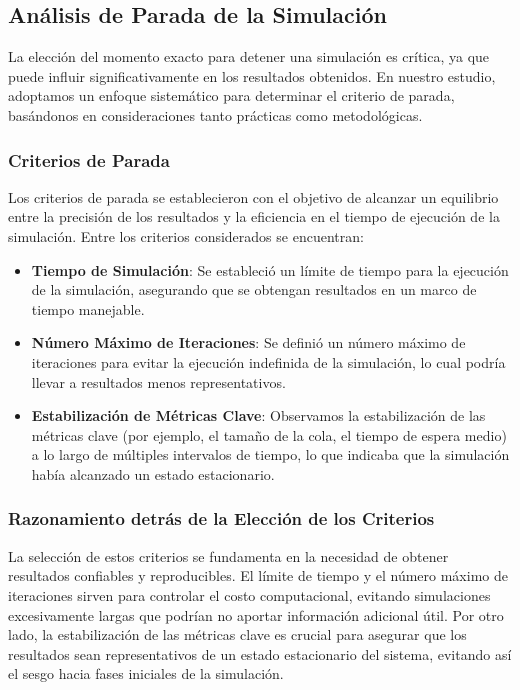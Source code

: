 \documentclass[10pt,twocolumn]{article}
\begin{document}
{\subsection{Análisis de Parada de la Simulación}
La elección del momento exacto para detener una simulación es crítica, ya que puede influir significativamente en los resultados obtenidos. En nuestro estudio, adoptamos un enfoque sistemático para determinar el criterio de parada, basándonos en consideraciones tanto prácticas como metodológicas.

\subsubsection{Criterios de Parada}
Los criterios de parada se establecieron con el objetivo de alcanzar un equilibrio entre la precisión de los resultados y la eficiencia en el tiempo de ejecución de la simulación. Entre los criterios considerados se encuentran:

\begin{itemize}
	\item \textbf{Tiempo de Simulación}: Se estableció un límite de tiempo para la ejecución de la simulación, asegurando que se obtengan resultados en un marco de tiempo manejable.
	\item \textbf{Número Máximo de Iteraciones}: Se definió un número máximo de iteraciones para evitar la ejecución indefinida de la simulación, lo cual podría llevar a resultados menos representativos.
	\item \textbf{Estabilización de Métricas Clave}: Observamos la estabilización de las métricas clave (por ejemplo, el tamaño de la cola, el tiempo de espera medio) a lo largo de múltiples intervalos de tiempo, lo que indicaba que la simulación había alcanzado un estado estacionario.
\end{itemize}

\subsubsection{Razonamiento detrás de la Elección de los Criterios}
La selección de estos criterios se fundamenta en la necesidad de obtener resultados confiables y reproducibles. El límite de tiempo y el número máximo de iteraciones sirven para controlar el costo computacional, evitando simulaciones excesivamente largas que podrían no aportar información adicional útil. Por otro lado, la estabilización de las métricas clave es crucial para asegurar que los resultados sean representativos de un estado estacionario del sistema, evitando así el sesgo hacia fases iniciales de la simulación.

}
\end{document}
